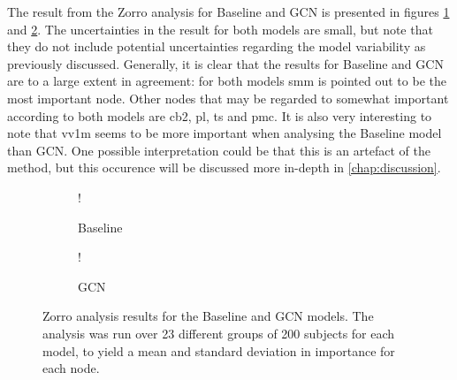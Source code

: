 The result from the Zorro analysis for Baseline and GCN is presented in figures \ref{fig:zorro_sex_baseline} and \ref{fig:zorro_sex_gcn}. The uncertainties in the result for both models are small, but note that they do not include potential uncertainties regarding the model variability as previously discussed. Generally, it is clear that the results for Baseline and GCN are to a large extent in agreement: for both models \acrshort{smm} is pointed out to be the most important node. Other nodes that may be regarded to somewhat important according to both models are \acrshort{cb2}, \acrshort{pl}, \acrshort{ts} and \acrshort{pmc}. It is also very interesting to note that \acrshort{vv1m} seems to be more important when analysing the Baseline model than GCN. One possible interpretation could be that this is an artefact of the method, but this occurence will be discussed more in-depth in \cref{chap:discussion}.




\begin{figure}[!htbp]
    \centering
        \begin{subfigure}{.5\textwidth}
            \centering
            \begin{center}
                \resizebox {1.0\linewidth} {!} {
                    
                }
            \end{center}
            \caption{Baseline}
            \label{fig:zorro_sex_baseline}
        \end{subfigure}%
        \begin{subfigure}{.5\textwidth}
            \centering
            \begin{center}
                \resizebox {1.0\linewidth} {!} {
                    
                }
            \end{center}
            \caption{GCN}
            \label{fig:zorro_sex_gcn}
        \end{subfigure}
    \caption{Zorro analysis results for the Baseline and GCN models. The analysis was run over 23 different groups of 200 subjects for each model, to yield a mean and standard deviation in importance for each node.}
    \label{fig:zorro_sex}
\end{figure}


